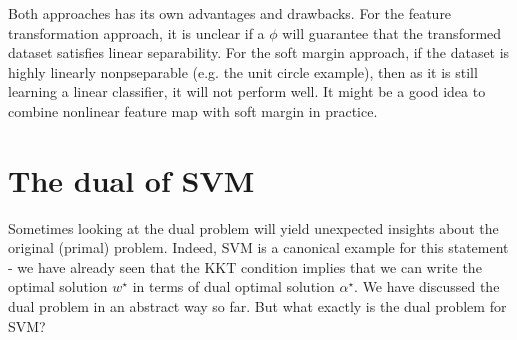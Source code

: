\documentclass{article}
\begin{document}
Both approaches has its own advantages and drawbacks. For the feature transformation approach, it is unclear if a $\phi$ will guarantee that the transformed dataset satisfies linear separability. For the soft margin approach, if the dataset is highly linearly nonpseparable (e.g. the unit circle example), then as it is still learning a linear classifier, it will not perform well. It might be a good idea to combine nonlinear feature map with soft margin in practice.

\section{The dual of SVM}
Sometimes looking at the dual problem will yield unexpected insights about the original (primal) problem. Indeed, SVM is a canonical example for this statement - we have already seen that the KKT condition implies that we can write the optimal solution $w^\star$ in terms of dual optimal solution $\alpha^\star$. We have discussed the dual problem in an abstract way so far. But what exactly is the dual problem for SVM?
\end{document}

